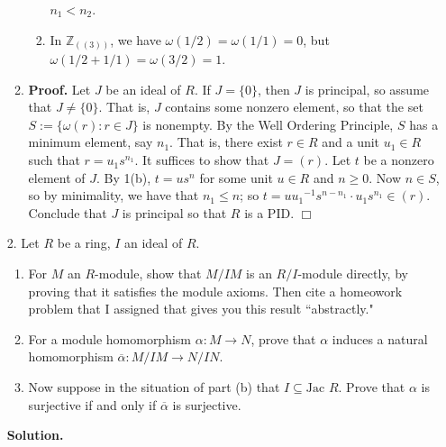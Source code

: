 \documentclass[9pt]{article}
\newcommand{\qed}{\hfill \ensuremath{\Box}}
\newcommand{\Z}{\mathbb{Z}}
\begin{document}
\begin{enumerate}
\begin{enumerate}
\begin{enumerate}
                        $n_1 < n_2$.
                  \item In $\Z_{((3))}$, we have $\omega(1/2) = \omega(1/1) = 0$,
                        but $\omega(1/2 + 1/1) = \omega(3/2) = 1$.
               \end{enumerate}
         \item \textbf{Proof.} Let $J$ be an ideal of $R$. If $J = \{0\}$,
               then $J$ is principal, so assume that $J \neq \{0\}$. That is,
               $J$ contains some nonzero element, so that the set
               $S := \{\omega(r) : r \in J\}$ is nonempty. By the Well Ordering
               Principle, $S$ has a minimum element, say $n_1$. That is, there
               exist $r \in R$ and a unit $u_1 \in R$ such that
               $r = u_1s^{n_1}$. It suffices to show that $J = (r)$. Let $t$ be
               a nonzero element of $J$. By 1(b), $t = us^n$ for some unit
               $u \in R$ and $n \ge 0$. Now $n \in S$, so by minimality, we have
               that $n_1 \le n$; so
               $t = u{u_1}^{-1}s^{n-n_1}\cdot u_1s^{n_1} \in (r)$. Conclude that
               $J$ is principal so that $R$ is a PID. \qed
      \end{enumerate}
   \item[2.]   Let $R$ be a ring, $I$ an ideal of $R$.
               \begin{enumerate}
                  \item For $M$ an $R$-module, show that $M/IM$ is an
                        $R/I$-module directly, by proving that it satisfies the
                        module axioms. Then cite a homeowork problem that I
                        assigned that gives you this result ``abstractly."
                  \item For a module homomorphism $\alpha : M \rightarrow N$,
                        prove that $\alpha$ induces a natural homomorphism
                        $\overline{\alpha} : M/IM \rightarrow N/IN$.
                  \item Now suppose in the situation of part (b) that
                        $I \subseteq \text{Jac }R$. Prove that $\alpha$ is
                        surjective if and only if $\overline{\alpha}$ is
                        surjective.
               \end{enumerate}

      \textbf{Solution.}
      

\end{enumerate}
\end{document}
